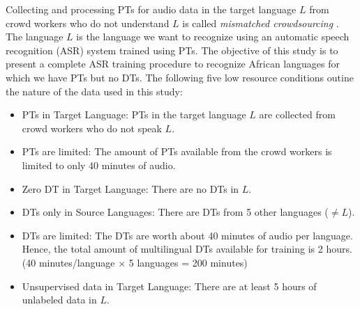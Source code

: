 \documentclass[a4paper]{article}
\begin{document}
Collecting and processing PTs for audio data in the target language $L$ from crowd workers who do not understand $L$ is called \emph{mismatched crowdsourcing} \cite{Jyothi-MismatchedCrowdsourcingTrans}. The language $L$ is the language we want to recognize using an automatic speech recognition (ASR) system trained using PTs. The objective of this study is to present a complete ASR training procedure to recognize African languages for which we have PTs but no DTs. 
 The following five low resource conditions outine the nature of the data used in this study:  \vspace{-1mm}
\begin{itemize}[leftmargin=*]
\item PTs in Target Language: PTs in the target language $L$ are collected from crowd workers who do not speak $L$. \vspace{-2mm}
\item PTs are limited: The amount of PTs available from the crowd workers is limited to only 40 minutes of audio.  \vspace{-2mm}
\item Zero DT in Target Language: There are no DTs in $L$.  \vspace{-2mm}
\item DTs only in Source Languages: There are DTs from 5 other languages ($\ne L$).  \vspace{-2mm}
\item DTs are limited: The DTs are worth about 40 minutes of audio per language. Hence, the total amount of multilingual DTs available for training is 2 hours. (40 minutes/language $\times$ 5 languages = 200 minutes)  \vspace{-1mm}
\item Unsupervised data in Target Language: There are at least 5 hours of unlabeled data in $L$.  \vspace{-1mm}
\end{itemize}
\end{document}
